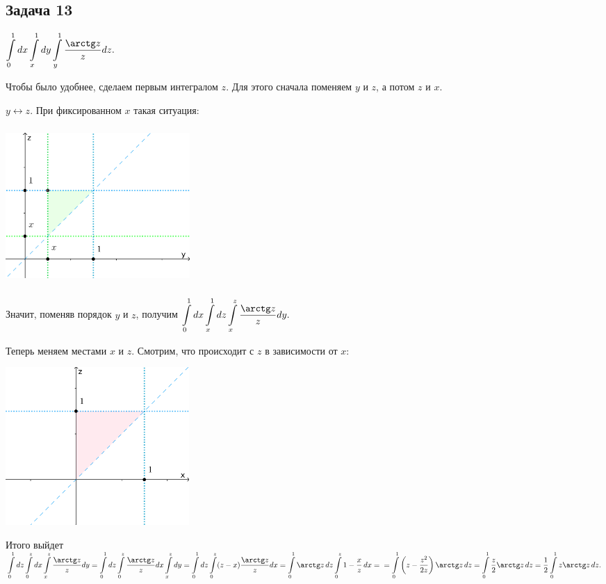 \documentclass[a4paper, fleqn]{article}
\begin{document}
    \subsection*{Задача 13}

    $\displaystyle \int\limits_{0}^{1} dx \int\limits_{x}^{1} dy \int\limits_{y}^{1} \frac{\arctg z}{z} dz.$

    Чтобы было удобнее, сделаем первым интегралом $z$. Для этого сначала поменяем $y$ и $z$, а потом $z$ и $x$. 

    $y \leftrightarrow z.$ При фиксированном $x$ такая ситуация:

    \includegraphics[width=7cm, height=6cm]{list24imgs/task 2.4.13-1.png}

    Значит, поменяв порядок  $y$ и $z$, получим $\displaystyle \int\limits_{0}^{1} dx \int\limits_{x}^{1} dz \int\limits_{x}^{z} \frac{\arctg z}{z} dy.$

    Теперь меняем местами $x$ и $z$. Смотрим, что происходит с $z$ в зависимости от $x$:

    \includegraphics[width=7cm, height=6cm]{list24imgs/task 2.4.13-2.png}

    Итого выйдет $\displaystyle \int\limits_{0}^{1} dz \int\limits_{0}^{z} dx \int\limits_{x}^{z} \frac{\arctg z}{z} dy = \int\limits_{0}^{1} dz \int\limits_{0}^{z}  \frac{\arctg z}{z}  dx \int\limits_{x}^{z}  dy = \int\limits_{0}^{1} dz \int\limits_{0}^{z}  (z - x)\frac{\arctg z}{z}  dx  = \int\limits_{0}^{1} \arctg z \, dz \int\limits_{0}^{z}  1 - \frac{x}{z}  \, dx = \\ = \int\limits_{0}^{1} \left(z - \frac{z^2}{2z} \right)\arctg z \, dz = \int\limits_{0}^{1} \frac{z}{2} \arctg z \, dz = \frac{1}{2} \int\limits_{0}^{1} z \arctg z \, dz.$
\end{document}
